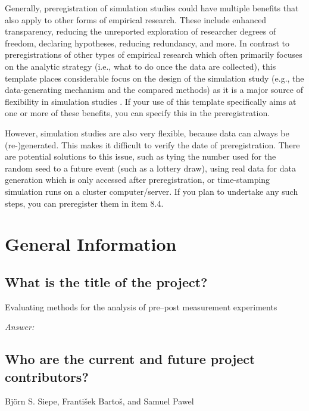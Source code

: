 \documentclass[12pt]{article}
\begin{document}
{Generally, preregistration of simulation studies could have multiple benefits that also apply to other forms of empirical research. These include enhanced transparency, reducing the unreported exploration of researcher degrees of freedom, declaring hypotheses, reducing redundancy, and more. In contrast to preregistrations of other types of empirical research which often primarily focuses on the analytic strategy (i.e., what to do once the data are collected), this template places considerable focus on the design of the simulation study (e.g., the data-generating mechanism and the compared methods) as it is a major source of flexibility in simulation studies \parencite{pawel2024pitfalls}. If your use of this template specifically aims at one or more of these benefits, you can specify this in the preregistration.

However, simulation studies are also very flexible, because data can always be (re-)generated. This makes it difficult to verify the date of preregistration. There are potential solutions to this issue, such as tying the number used for the random seed to a future event (such as a lottery draw), using real data for data generation which is only accessed after preregistration, or time-stamping simulation runs on a cluster computer/server. If you plan to undertake any such steps, you can preregister them in item 8.4.
}

\section{General Information}
\subsection{What is the title of the project?}

\begin{examplebox}
Evaluating methods for the analysis of pre--post measurement experiments
\end{examplebox}

\textit{Answer:}

\subsection{Who are the current and future project contributors?}

\begin{examplebox}
    Björn S. Siepe, František Bartoš, and Samuel Pawel
\end{examplebox}
\end{document}
